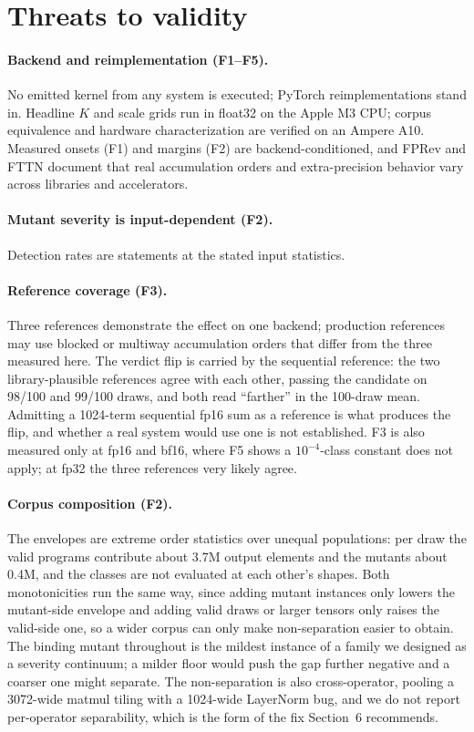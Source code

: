 \documentclass[twocolumn,10pt]{article}
\begin{document}
\section{Threats to validity}\label{sec:threats}

\paragraph{Backend and reimplementation (F1--F5).} No emitted kernel
from any system is executed; PyTorch reimplementations stand in.
Headline $K$ and scale grids run in float32 on the Apple M3 CPU; corpus
equivalence and hardware characterization are verified on an Ampere A10.
Measured onsets (F1) and margins (F2) are backend-conditioned, and FPRev
and FTTN document that real accumulation orders and extra-precision
behavior vary across libraries and accelerators.

\paragraph{Mutant severity is input-dependent (F2).} Detection rates are
statements at the stated input statistics.

\paragraph{Reference coverage (F3).} Three references demonstrate the
effect on one backend; production references may use blocked or multiway
accumulation orders that differ from the three measured here. The
verdict flip is carried by the sequential reference: the two
library-plausible references agree with each other, passing the
candidate on 98/100 and 99/100 draws, and both read ``farther'' in the
100-draw mean. Admitting a 1024-term sequential fp16 sum as a reference
is what produces the flip, and whether a real system would use one is
not established. F3 is also measured only at fp16 and bf16, where F5
shows a $10^{-4}$-class constant does not apply; at fp32 the three
references very likely agree.

\paragraph{Corpus composition (F2).} The envelopes are extreme order
statistics over unequal populations: per draw the valid programs
contribute about 3.7M output elements and the mutants about 0.4M, and
the classes are not evaluated at each other's shapes. Both
monotonicities run the same way, since adding mutant instances only
lowers the mutant-side envelope and adding valid draws or larger tensors
only raises the valid-side one, so a wider corpus can only make
non-separation easier to obtain. The binding mutant throughout is the
mildest instance of a family we designed as a severity continuum; a
milder floor would push the gap further negative and a coarser one might
separate. The non-separation is also cross-operator, pooling a
3072-wide matmul tiling with a 1024-wide LayerNorm bug, and we do not
report per-operator separability, which is the form of the fix
Section~6 recommends.
\end{document}
